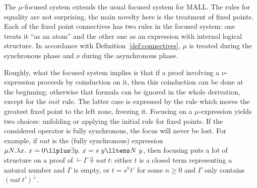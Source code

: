 The $\mu$-focused system extends the usual focused system for MALL.
The rules for equality are not surprising,
the main novelty here is the treatment of fixed points.
Each of the fixed point connectives has two rules in the focused 
system:  one treats it ``as an atom'' and the other one as an expression with
internal logical structure.
In accordance with Definition~\ref{def:connectives},
$\mu$ is treated during the synchronous phase
and $\nu$ during the asynchronous phase.

Roughly, what the focused system implies is that
if a proof involving a $\nu$-expression
proceeds by coinduction on it, then this coinduction can be done at the 
beginning;
otherwise that formula can be ignored in the whole derivation,
except for the $init$ rule.
The latter case is expressed by the rule which moves the greatest fixed
point to the left zone, freezing it.
Focusing on a $\mu$-expression yields two choices: unfolding or applying the 
initial rule for fixed points.
If the considered operator is fully synchronous, the focus will never be lost.
For example, if $nat$ is the (fully synchronous) expression
$\mu N. \lambda{}x.~ x=0 \llplus \exists{}y.~ x=s~y \lltens N~y$,
then focusing puts a lot of structure on a proof of
$\vdash \Gamma\Downarrow nat~t$: 
either $t$ is a closed term representing a natural number and $\Gamma$ is empty,
or $t = s^n t'$ for some $n\geq 0$ and $\Gamma$ only contains $(nat~t')^\bot$.

